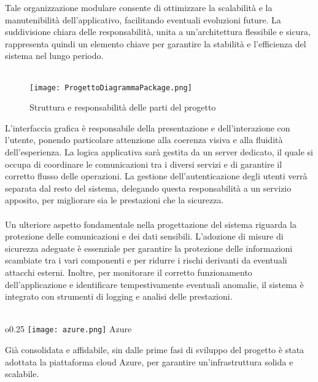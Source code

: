 Tale organizzazione modulare consente di ottimizzare 
la scalabilità e la manutenibilità dell'applicativo,
facilitando eventuali evoluzioni future.
La suddivisione chiara delle responsabilità, unita a un'architettura flessibile e sicura,
rappresenta quindi un elemento chiave per garantire 
la stabilità e l'efficienza del sistema nel lungo periodo.\\
\\
\begin{figure}[htb]
    \centering
    \texttt{[image: ProgettoDiagrammaPackage.png]}
    \caption{Struttura e responsabilità delle parti del progetto}
\end{figure}
\clearpage
L'interfaccia grafica è responsabile della presentazione e dell'interazione con l'utente,
ponendo particolare attenzione alla coerenza visiva e alla fluidità dell'esperienza.
La logica applicativa sarà gestita da un server dedicato,
il quale si occupa di coordinare le comunicazioni tra i diversi servizi
e di garantire il corretto flusso delle operazioni.
La gestione dell'autenticazione degli utenti verrà separata dal resto del sistema,
delegando questa responsabilità a un servizio apposito,
per migliorare sia le prestazioni che la sicurezza.\\
\\
Un ulteriore aspetto fondamentale nella progettazione del sistema riguarda
la protezione delle comunicazioni e dei dati sensibili.
L'adozione di misure di sicurezza adeguate è essenziale
per garantire la protezione delle informazioni scambiate tra i vari componenti e
per ridurre i rischi derivanti da eventuali attacchi esterni.
Inoltre, per monitorare il corretto funzionamento dell'applicazione e
identificare tempestivamente eventuali anomalie,
il sistema è integrato con strumenti di logging e analisi delle prestazioni.\\
\\
\begin{wrapfigure}{o}{0.25\textwidth}
    \centering
    \texttt{[image: azure.png]}
    Azure
\end{wrapfigure}
Già consolidata e affidabile,
sin dalle prime fasi di sviluppo del progetto è stata adottata la piattaforma cloud Azure,
per garantire un'infrastruttura solida e scalabile.
\clearpage
